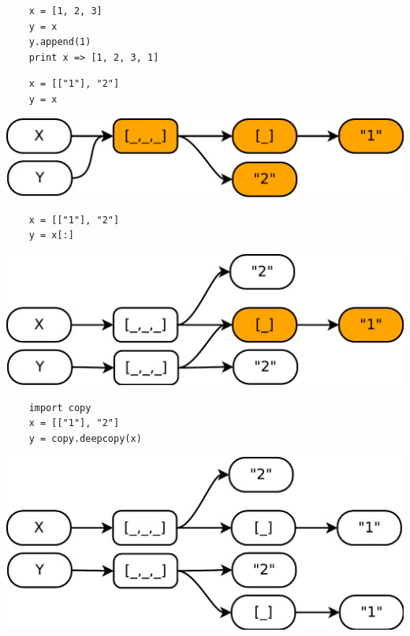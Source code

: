 \documentclass{article}
\begin{document}
\vspace{15pt}
\begin{lstlisting}
	x = [1, 2, 3]
	y = x
	y.append(1)
	print x => [1, 2, 3, 1]
\end{lstlisting}
\newpage

\vspace{15pt}
\begin{lstlisting}
	x = [["1"], "2"]
	y = x
\end{lstlisting}
\includegraphics[scale=0.6]{images/refs_1.pdf}

\vspace{15pt}
\begin{lstlisting}
	x = [["1"], "2"]
	y = x[:]
\end{lstlisting}
\includegraphics[scale=0.6]{images/refs_2.pdf}

\newpage

\vspace{15pt}
\begin{lstlisting}
	import copy
	x = [["1"], "2"]
	y = copy.deepcopy(x)
\end{lstlisting}
\includegraphics[scale=0.6]{images/refs_3.pdf}
\end{document}
